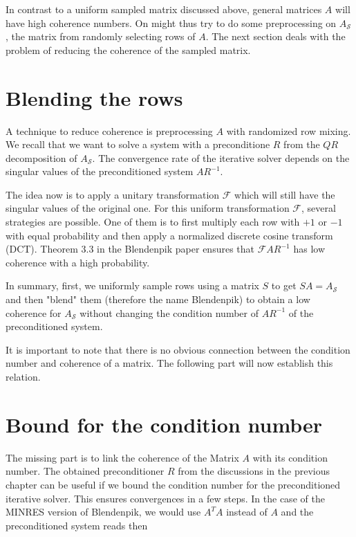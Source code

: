\documentclass{article}
\begin{document}
In contrast to a uniform sampled matrix discussed above, general matrices $A$
will have high coherence numbers. On might thus try to do some preprocessing on
$A_\mathcal{S}$, the matrix from randomly selecting rows of $A$. The next section
deals with the problem of reducing the coherence of the sampled matrix. 

\section{Blending the rows} \label{blend}
A technique to reduce coherence is preprocessing $A$ with randomized row
mixing. We recall that we want to solve a system with a preconditione $R$ from
the $QR$ decomposition of $A_\mathcal{S}$. The convergence rate of the
iterative solver depends on the singular values of the preconditioned system
$AR^{-1}$.

The idea now is to apply a unitary transformation $\mathcal{F}$ which will
still have the singular values of the original one. For this uniform
transformation $\mathcal{F}$, several strategies are possible. One of them is
to first multiply each row with $+1$ or $-1$ with equal probability and then
apply a normalized discrete cosine transform (DCT).
Theorem 3.3 in the Blendenpik paper \cite{blendenpik} ensures that
$\mathcal{F}AR^{-1}$ has low coherence with a high probability.

\smallskip

In summary, first, we uniformly sample rows using a matrix $S$ to get $SA =
A_\mathcal{S}$ and then "blend" them (therefore the name Blendenpik) to obtain
a low coherence for $A_\mathcal{S}$ without changing the condition number of
$AR^{-1}$ of the preconditioned system.

It is important to note that there is no obvious connection between the
condition number and coherence of a matrix. The following part will now
establish this relation. 

\section{Bound for the condition number} \label{bound}
The missing part is to link the coherence of the Matrix $A$ with its condition
number. The obtained preconditioner $R$ from the discussions in the previous
chapter can be useful if we bound the condition number for the
preconditioned iterative solver. This ensures convergences in a few steps. In
the case of the MINRES version of Blendenpik, we would use $A^TA$ instead of
$A$ and the preconditioned system reads then
\end{document}
